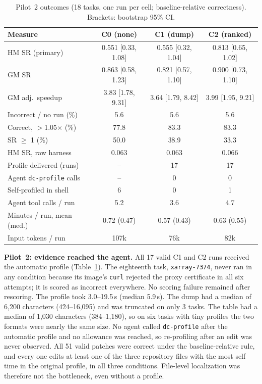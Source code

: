 \documentclass[conference]{IEEEtran}
\newcommand{\tool}{\texttt{dc-profile}}
\begin{document}
\begin{table}[t]
\caption{Pilot~2 outcomes (18 tasks, one run per cell; baseline-relative
correctness). Brackets: bootstrap 95\% CI.}
\label{tab:main}
\centering
\scriptsize
\setlength{\tabcolsep}{2.5pt}
\begin{tabular}{@{}lccc@{}}
\toprule
Measure & C0 (none) & C1 (dump) & C2 (ranked) \\
\midrule
HM SR (primary) & 0.551 [0.33, 1.08] & 0.555 [0.32, 1.04] & 0.813 [0.65, 1.02] \\
GM SR & 0.863 [0.58, 1.23] & 0.821 [0.57, 1.10] & 0.900 [0.73, 1.10] \\
GM adj.\ speedup & 3.83 [1.78, 9.31] & 3.64 [1.79, 8.42] & 3.99 [1.95, 9.21] \\
Incorrect / no run (\%) & 5.6 & 5.6 & 5.6 \\
Correct, $>$1.05$\times$ (\%) & 77.8 & 83.3 & 83.3 \\
SR $\ge$ 1 (\%) & 50.0 & 38.9 & 33.3 \\
HM SR, raw harness & 0.063 & 0.063 & 0.066 \\
\midrule
Profile delivered (runs) & -- & 17 & 17 \\
Agent \tool{} calls & -- & 0 & 0 \\
Self-profiled in shell & 6 & 0 & 1 \\
Agent tool calls / run & 5.2 & 3.6 & 4.7 \\
Minutes / run, mean (med.) & 0.72 (0.47) & 0.57 (0.43) & 0.63 (0.55) \\
Input tokens / run & 107k & 76k & 82k \\
\bottomrule
\end{tabular}
\end{table}

\textbf{Pilot~2: evidence reached the agent.} All 17 valid C1 and C2 runs
received the automatic profile (Table~\ref{tab:main}). The eighteenth task,
\texttt{xarray-7374}, never ran in any condition because its image's
\texttt{curl} rejected the proxy certificate in all six attempts; it is scored
as incorrect everywhere. No scoring failure remained after rescoring. The
profile took 3.0--19.5\,s (median 5.9\,s). The dump had a median of 6{,}200
characters (424--16{,}095) and was truncated on only 3 tasks. The table had a
median of 1{,}030 characters (384--1{,}180), so on six tasks with tiny
profiles the two formats were nearly the same size. No agent called
\tool{} after the automatic profile and no allowance was reached, so
re-profiling after an edit was never observed. All 51 valid patches were
correct under the baseline-relative rule, and every one edits at least one of
the three repository files with the most self time in the original profile,
in all three conditions. File-level localization was therefore not the
bottleneck, even without a profile.
\end{document}

